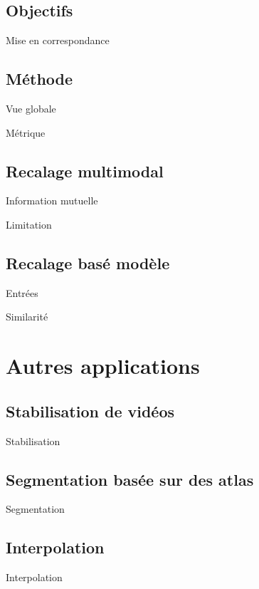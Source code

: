 \documentclass{beamer}
\begin{document}
\subsection{Objectifs}
\begin{frame}{Mise en correspondance}
 
\end{frame}

\subsection{Méthode}
\begin{frame}{Vue globale}
 
\end{frame}
\begin{frame}{Métrique}
 
\end{frame}

\subsection{Recalage multimodal}
\begin{frame}{Information mutuelle}
 
\end{frame}
\begin{frame}{Limitation}
 
\end{frame}

\subsection{Recalage basé modèle}
\begin{frame}{Entrées}
 
\end{frame}
\begin{frame}{Similarité}
 
\end{frame}

\section{Autres applications}
\subsection{Stabilisation de vidéos}
\begin{frame}{Stabilisation}
 
\end{frame}

\subsection{Segmentation basée sur des atlas}
\begin{frame}{Segmentation}
 
\end{frame}
\subsection{Interpolation}
\begin{frame}{Interpolation}
 
\end{frame}
\end{document}
